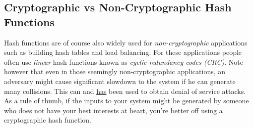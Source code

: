 \subsection{Cryptographic vs Non-Cryptographic Hash
Functions}\label{7-Cryptographic-vs-Non-C}

Hash functions are of course also widely used for
\emph{non-cryptographic} applications such as building hash tables and
load balancing. For these applications people often use \emph{linear}
hash functions known as \emph{cyclic redundancy codes (CRC)}. Note
however that even in those seemingly non-cryptographic applications, an
adversary might cause significant slowdown to the system if he can
generate many collisions. This can and
\href{http://arstechnica.com/business/2011/12/huge-portions-of-web-vulnerable-to-hashing-denial-of-service-attack/}{has}
been used to obtain denial of service attacks. As a rule of thumb, if
the inputs to your system might be generated by someone who does not
have your best interests at heart, you're better off using a
cryptographic hash function.
